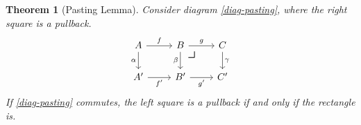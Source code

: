 \documentclass{article}
\newtheorem{thm}{Theorem}
\theoremstyle{definition}
\theoremstyle{remark}
\newcommand{\pullback}{\mbox{\LARGE$\lrcorner$}}
\begin{document}
\begin{thm}[Pasting Lemma]
    Consider diagram \eqref{diag-pasting}, where the right square is a pullback.
    \begin{equation}\label{diag-pasting}
        \begin{tikzcd}
            A \arrow[r, "f"] \arrow[d, "\alpha"'] & B \arrow[r, "g"] \arrow[d, "\beta"'] \arrow[rd, phantom ,"\pullback", very near start] & C \arrow[d, "\gamma"] \\
            A' \arrow[r, "f'"']                   & B' \arrow[r, "g'"']                                                      & C'                   
        \end{tikzcd}       
    \end{equation}
    If \eqref{diag-pasting} commutes, the left square is a pullback if and only if the rectangle is.
\end{thm}
\end{document}
